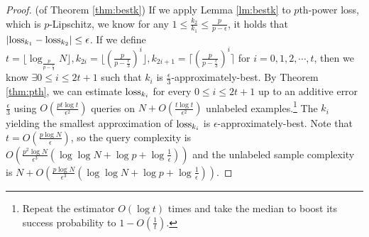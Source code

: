 \begin{proof}(of Theorem \ref{thm:bestk})
If we apply Lemma \ref{lm:bestk} to $p$th-power loss, which is $p$-Lipschitz, we know for any $1\leq \frac{k_2}{k_1}\leq \frac{p}{p-\epsilon}$, it holds that $|{\mathrm{loss}}_{k_1}-{\mathrm{loss}}_{k_2}|\leq\epsilon$. If we define $t=\lfloor\log_{\frac{p}{p-\frac{\epsilon}{3}}}N\rfloor,k_{2i}=\lfloor(\frac{p}{p-\frac{\epsilon}{3}})^i\rfloor,k_{2i+1}=\lceil(\frac{p}{p-\frac{\epsilon}{3}})^i\rceil$ for $i=0,1,2,\cdots,t$, then we know $\exists 0\leq i\leq 2t+1$ such that $k_i$ is $\frac{\epsilon}{3}$-approximately-best. By Theorem \ref{thm:pth}, we can estimate ${\mathrm{loss}}_{k_i}$ for every $0\leq i\leq 2t+1$ up to an additive error $\frac{\epsilon}{3}$ using $O(\frac{pt\log t}{\epsilon^2})$ queries on $N+O(\frac{t\log t}{\epsilon^2})$ unlabeled examples.\footnote{Repeat the estimator $O(\log t)$ times and take the median to boost its success probability to $1-O(\frac{1}{t})$.} The $k_i$ yielding the smallest approximation of ${\mathrm{loss}}_{k_i}$ is $\epsilon$-approximately-best. Note that $t=O(\frac{p\log N}{\epsilon})$, so the query complexity is $O(\frac{p^2\log N}{\epsilon^3}(\log\log N+\log p+\log\frac{1}{\epsilon}))$ and the unlabeled sample complexity is $N+O(\frac{p\log N}{\epsilon^3}(\log\log N+\log p+\log\frac{1}{\epsilon}))$.
\end{proof}
